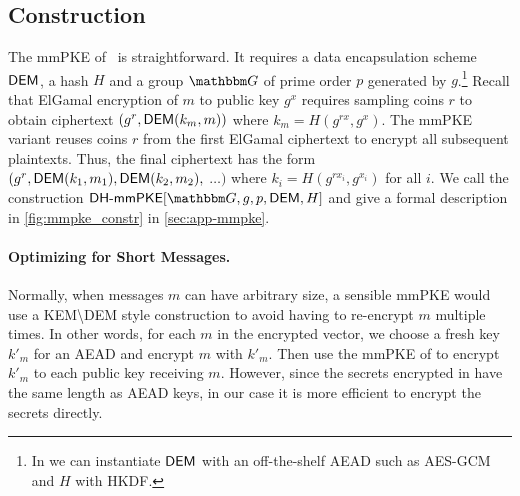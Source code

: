 
\subsection{Construction}
The mmPKE of~\cite{ASIACCS:PinPoeSch14} is straightforward. It requires a
data encapsulation scheme ${\mathsf{DEM}}$, a hash $H$ and a group $\Grp$ of prime order $p$ generated by $g$.\footnote{In \saik we can instantiate ${\mathsf{DEM}}$ with an off-the-shelf
AEAD such as AES-GCM and $H$ with HKDF.} Recall that
ElGamal encryption of $m$ to public key $g^x$ requires sampling coins $r$ to
obtain ciphertext $(g^r, {\mathsf{DEM}}(k_m, m))$ where $k_m = H(g^{rx}, g^x)$. The
mmPKE variant reuses coins $r$ from the first ElGamal ciphertext to encrypt
all subsequent plaintexts. Thus, the final ciphertext has the form $(g^r,
{\mathsf{DEM}}(k_1, m_1), {\mathsf{DEM}}(k_2, m_2),$ $\ldots)$ where $k_i = H(g^{rx_i},
g^{x_i})$ for all $i$. We call the construction $\dhmmpke[\Grp,\allowbreak g,\allowbreak p,\allowbreak \dem, H]$ and give a formal description in \cref{fig:mmpke_constr} in \cref{sec:app-mmpke}.

\paragraph{Optimizing for Short Messages.}
Normally, when messages $m$ can have arbitrary size, a sensible mmPKE would use a
KEM{\textbackslash}DEM style construction to avoid having to re-encrypt $m$
multiple times. In other words, for each $m$ in the encrypted vector, we choose a fresh key $k'_m$
for an AEAD and encrypt $m$ with $k'_m$. Then use the mmPKE of
\cite{ASIACCS:PinPoeSch14} to encrypt $k'_m$ to each public key receiving $m$.
However, since the secrets encrypted in \saik have the same length as AEAD
keys, in our case it is more efficient to encrypt the secrets directly.


